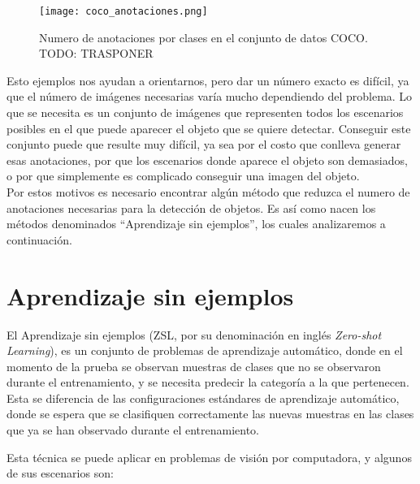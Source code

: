 \begin{figure}
	\centering
	\texttt{[image: coco\_anotaciones.png]}
	\caption{Numero de anotaciones por clases en el conjunto de datos COCO. TODO: TRASPONER}
	\label{fig:COCOAnotaciones}
\end{figure}

Esto ejemplos nos ayudan a orientarnos, pero dar un número exacto es difícil, ya que el número de imágenes necesarias varía mucho dependiendo del problema. Lo que se necesita es un conjunto de imágenes que representen todos los escenarios posibles en el que puede aparecer el objeto que se quiere detectar. Conseguir este conjunto puede que resulte muy difícil, ya sea por el costo que conlleva generar esas anotaciones, por que los escenarios donde aparece el objeto son demasiados, o por que simplemente es complicado conseguir una imagen del objeto.\\

Por estos motivos es necesario encontrar algún método que reduzca el numero de anotaciones necesarias para la detección de objetos. Es así como nacen los métodos denominados ``Aprendizaje sin ejemplos'', los cuales analizaremos a continuación.
 
\section{Aprendizaje sin ejemplos} \label{sec:aprendizajesinejemplos}
El Aprendizaje sin ejemplos (ZSL, por su denominación en inglés \textit{Zero-shot Learning}), es un conjunto de problemas de aprendizaje automático, donde en el momento de la prueba se observan muestras de clases que no se observaron durante el entrenamiento, y se necesita predecir la categoría a la que pertenecen. Esta se diferencia de las configuraciones estándares de aprendizaje automático, donde se espera que se clasifiquen correctamente las nuevas muestras en las clases que ya se han observado durante el entrenamiento. 

Esta técnica se puede aplicar en problemas de visión por computadora, y algunos de sus escenarios son:

